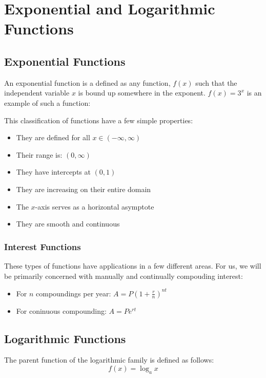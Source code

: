 \chapter{Exponential and Logarithmic Functions}
\section{Exponential Functions}
An exponential function is a defined as any function, $f(x)$ such that the
independent variable $x$ is bound up somewhere in the exponent.  $f(x)=3^x$ is
an example of such a function:


This classification of functions have a few simple properties:

\begin{itemize}
  \item{They are defined for all $x\in(-\infty,\infty)$}
  \item{Their range is: $(0, \infty)$}
  \item{They have intercepts at $(0,1)$}
  \item{They are increasing on their entire domain}
  \item{The $x$-axis serves as a horizontal asymptote}
  \item{They are smooth and continuous}
\end{itemize}

\subsection{Interest Functions}
These types of functions have applications in a few different areas.  For us, we
will be primarily concerned with manually and continually compouding interest:

\begin{itemize}
  \item{For $n$ compoundings per year: $A=P(1+\frac{r}{n})^{nt}$}
  \item{For coninuous compounding: $A=Pe^{rt}$}
\end{itemize}

\section{Logarithmic Functions}
The parent function of the logarithmic family is defined as follows:
\begin{equation}
  f(x)=\log_ax
\end{equation}


